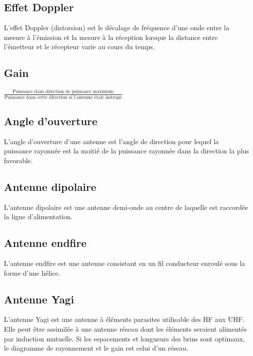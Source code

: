 \documentclass[12pt]{article}
\begin{document}
\subsection{Effet Doppler}

L'effet Doppler (distorsion) est le décalage de fréquence d’une onde entre la mesure à l'émission et la mesure à la réception lorsque la distance entre l'émetteur et le récepteur varie au cours du temps.

\subsection{Gain}

\begin{center}
$ \frac{\text{Puissance dans direction de puissance maximum}}{\text{Puissance dans cette direction si l'antenne était isotrope}} $
\end{center}

\subsection{Angle d'ouverture}

L'angle d'ouverture d'une antenne est l'angle de direction pour lequel la puissance rayonnée est la moitié de la puissance rayonnée dans la direction la plus favorable. 

\subsection{Antenne dipolaire}

L'antenne dipolaire est une antenne demi-onde au centre de laquelle est raccordée la ligne d'alimentation.

\subsection{Antenne endfire}

L'antenne endfire est une antenne consistant en un fil conducteur enroulé sous la forme d'une hélice.

\subsection{Antenne Yagi}

L'antenne Yagi est une antenne à éléments parasites utilisable des HF aux UHF. Elle peut être assimilée à une antenne réseau dont les éléments seraient alimentés par induction mutuelle. Si les espacements et longueurs des brins sont optimaux, le diagramme de rayonnement et le gain est celui d'un réseau.
\end{document}
